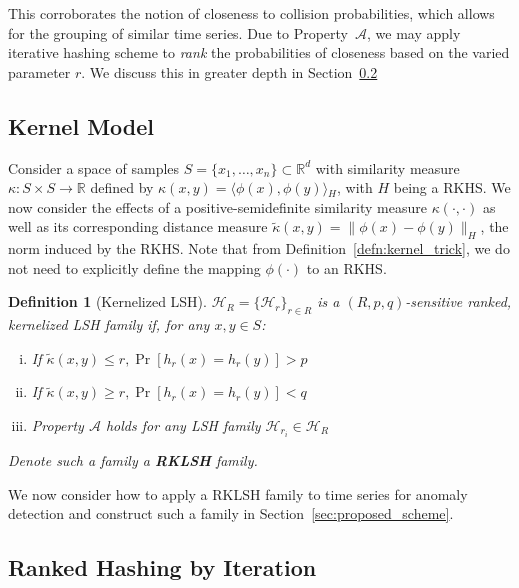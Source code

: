 \documentclass[a4paper]{article}
\newcommand{\innerproduct}[2]{\langle{}#1,#2\rangle{}}
\theoremstyle{def}
\newtheorem{definition}{Definition}
\theoremstyle{thm}
\newcommand{\R}[0]{\mathbb{R}}
\newcommand{\LSH}[0]{\mathcal{H}}
\begin{document}

This corroborates the notion of closeness to collision probabilities, which allows for the grouping of similar time series.
Due to Property~$\mathscr{A}$, we may apply iterative hashing scheme to \textit{rank} the probabilities of closeness based on the varied parameter $r$.
We discuss this in greater depth in Section~\ref{subsec:ranked_lsh}

\subsection{Kernel Model}
\label{subsec:kernel_model}

Consider a space of samples $S = \{x_1,\ldots,x_n\} \subset \R^d$ with similarity measure $\kappa \colon S \times S \rightarrow \R$ defined by $\kappa(x,y) = \innerproduct{\phi(x)}{\phi(y)}_H$, with $H$ being a RKHS.
We now consider the effects of a positive-semidefinite similarity measure $\kappa(\cdot, \cdot)$ as well as its corresponding distance measure $\tilde{\kappa}(x,y) = \|\phi(x) - \phi(y)\|_H$, the norm induced by the RKHS.
Note that from Definition~\ref{defn:kernel_trick}, we do not need to explicitly define the mapping $\phi(\cdot)$ to an RKHS.

\begin{definition}[Kernelized LSH]\label{defn:kernel_lsh}
    ${\LSH}_R = \{ {\LSH}_r \}_{r \in R}$ is a $(R, p, q)$-sensitive ranked, kernelized LSH family if, for any $x,y \in S$:
    \begin{enumerate}[(i)]
        \item If $\tilde{\kappa}(x,y) \le r, \Pr[h_r(x) = h_r(y)] > p$
        \item If $\tilde{\kappa}(x,y) \ge r, \Pr[h_r(x) = h_r(y)] < q$
        \item Property $\mathscr{A}$ holds for any LSH family ${\LSH}_{r_i} \in {\LSH}_R$
    \end{enumerate}
    Denote such a family a \textbf{RKLSH} family.
\end{definition}

We now consider how to apply a RKLSH family to time series for anomaly detection and construct such a family in Section~\ref{sec:proposed_scheme}.

\subsection{Ranked Hashing by Iteration}
\label{subsec:ranked_lsh}
\end{document}
